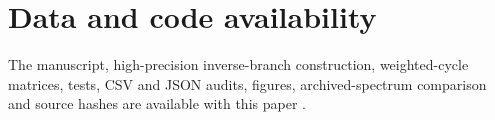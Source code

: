 \documentclass[11pt]{article}
\theoremstyle{definition}
\theoremstyle{remark}
\begin{document}
\section*{Data and code availability}

The manuscript, high-precision inverse-branch construction, weighted-cycle
matrices, tests, CSV and JSON audits, figures, archived-spectrum comparison
and source hashes are available with this paper
\citep{WangTimeOrderedCode2026}.



\end{document}
